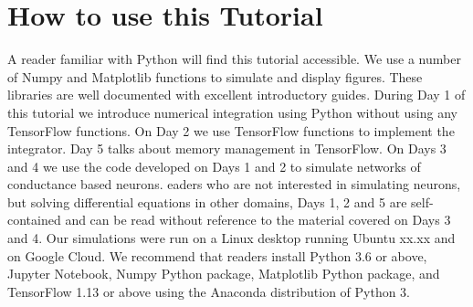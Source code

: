 \documentclass[10pt,letterpaper]{article}
\begin{document}

\section*{How to use this Tutorial}
A reader familiar with Python will find this tutorial accessible. We use a number of Numpy and Matplotlib functions to simulate and display figures. These libraries are well documented with excellent introductory guides. During Day 1 of this tutorial we introduce numerical integration using Python without using any TensorFlow functions. On Day 2 we use TensorFlow functions to implement the integrator. Day 5 talks about memory management in TensorFlow. On Days 3 and 4 we use the code developed on Days 1 and 2 to simulate networks of conductance based neurons. eaders who are not interested in simulating neurons, but solving differential equations in other domains, Days 1, 2 and 5 are self-contained and can be read without reference to the material covered on Days 3 and 4. 
Our simulations were run on a Linux desktop running Ubuntu xx.xx and on Google Cloud. We recommend that readers install Python 3.6 or above, Jupyter Notebook, Numpy Python package, Matplotlib Python package, and TensorFlow 1.13 or above using the Anaconda distribution of Python 3.

\end{document}
